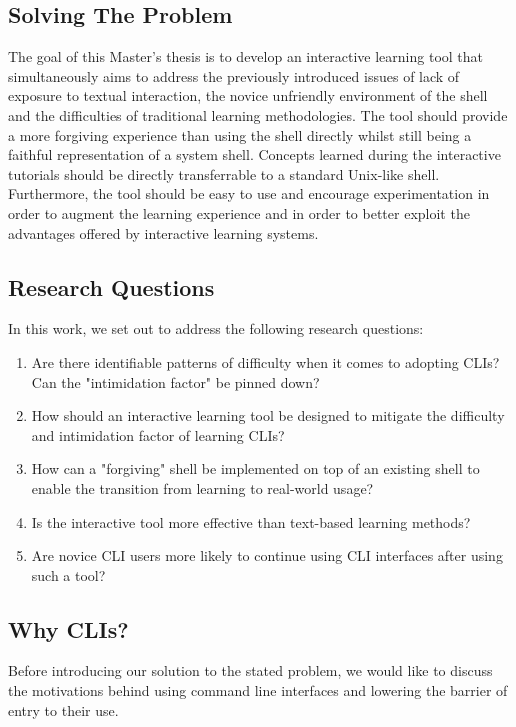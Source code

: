 \subsection{Solving The Problem} The goal of this Master's thesis is to develop
an interactive learning tool that simultaneously aims to address the previously
introduced issues of lack of exposure to textual interaction, the novice
unfriendly environment of the shell and the difficulties of traditional
learning methodologies. The tool should provide a more forgiving experience
than using the shell directly whilst still being a faithful representation of a
system shell. Concepts learned during the interactive tutorials should be
directly transferrable to a standard Unix-like shell. Furthermore, the tool
should be easy to use and encourage experimentation in order to augment the
learning experience and in order to better exploit the advantages offered by
interactive learning systems.

\subsection{Research Questions}
\label{subsec:rqs}

In this work, we set out to address the following research questions:

\begin{enumerate}[label=\textbf{RQ\arabic*}, leftmargin=*]
	\item Are there identifiable patterns of difficulty when it
	      comes to adopting CLIs? Can the "intimidation factor" be pinned down? \label{rq:1}
	\item How should an interactive learning tool be designed to mitigate
	      the difficulty and intimidation factor of learning CLIs? \label{rq:2}
	\item How can a "forgiving" shell be implemented on top of an existing
	      shell to enable the transition from learning to real-world usage? \label{rq:3}
	\item Is the interactive tool more effective than text-based learning methods? \label{rq:4}
	\item Are novice CLI users more likely to continue
	      using CLI interfaces after using such a tool? \label{rq:5}
\end{enumerate}

\subsection{Why CLIs?}
Before introducing our solution to the stated problem, we would like to discuss
the motivations behind using command line interfaces and lowering the barrier of
entry to their use.


